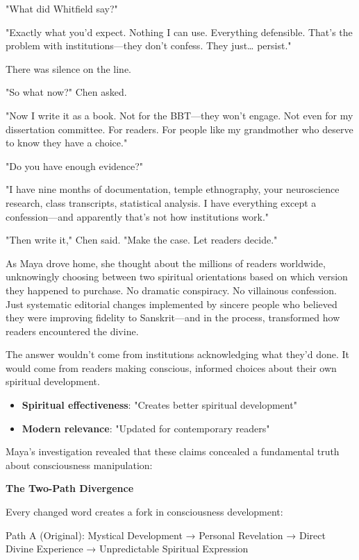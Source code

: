 \documentclass[12pt,twoside]{book}
\begin{document}
"What did Whitfield say?"

"Exactly what you'd expect. Nothing I can use. Everything defensible. That's the problem with institutions—they don't confess. They just\ldots{} persist."

There was silence on the line.

"So what now?" Chen asked.

"Now I write it as a book. Not for the BBT—they won't engage. Not even for my dissertation committee. For readers. For people like my grandmother who deserve to know they have a choice."

"Do you have enough evidence?"

"I have nine months of documentation, temple ethnography, your neuroscience research, class transcripts, statistical analysis. I have everything except a confession—and apparently that's not how institutions work."

"Then write it," Chen said. "Make the case. Let readers decide."

As Maya drove home, she thought about the millions of readers worldwide, unknowingly choosing between two spiritual orientations based on which version they happened to purchase. No dramatic conspiracy. No villainous confession. Just systematic editorial changes implemented by sincere people who believed they were improving fidelity to Sanskrit—and in the process, transformed how readers encountered the divine.

The answer wouldn't come from institutions acknowledging what they'd done. It would come from readers making conscious, informed choices about their own spiritual development.

\begin{itemize}
\item \textbf{\textbf{Spiritual effectiveness}}: "Creates better spiritual development"
\item \textbf{\textbf{Modern relevance}}: "Updated for contemporary readers"
\end{itemize}

Maya's investigation revealed that these claims concealed a fundamental truth about consciousness manipulation:

\textbf{\textbf{The Two-Path Divergence}}

Every changed word creates a fork in consciousness development:

Path A (Original): 
Mystical Development → Personal Revelation → Direct Divine Experience → Unpredictable Spiritual Expression
\end{document}
